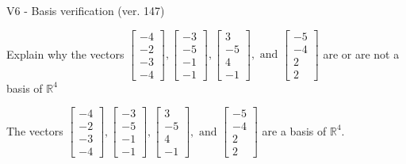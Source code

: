 \begin{exercise}
  \begin{exerciseTitle}V6 - Basis verification (ver. 147)\end{exerciseTitle}
  \begin{exerciseStatement}
    Explain why the vectors \(\left[\begin{array}{r}
-4 \\
-2 \\
-3 \\
-4
\end{array}\right] , \left[\begin{array}{r}
-3 \\
-5 \\
-1 \\
-1
\end{array}\right] , \left[\begin{array}{r}
3 \\
-5 \\
4 \\
-1
\end{array}\right] , \text{ and } \left[\begin{array}{r}
-5 \\
-4 \\
2 \\
2
\end{array}\right]\) are or are not a basis of \(\mathbb{R}^4\)	


  \end{exerciseStatement}
  \begin{exerciseAnswer}
   The vectors \(\left[\begin{array}{r}
-4 \\
-2 \\
-3 \\
-4
\end{array}\right] , \left[\begin{array}{r}
-3 \\
-5 \\
-1 \\
-1
\end{array}\right] , \left[\begin{array}{r}
3 \\
-5 \\
4 \\
-1
\end{array}\right] , \text{ and } \left[\begin{array}{r}
-5 \\
-4 \\
2 \\
2
\end{array}\right]\) 
  	 are  a basis of \(\mathbb{R}^4\).
  


  \end{exerciseAnswer}
\end{exercise}